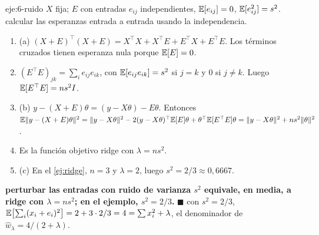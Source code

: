 \begin{solucion}{eje:6-ruido}
\datos $X$ fija; $E$ con entradas $e_{ij}$ independientes, $\mathbb{E}[e_{ij}]=0$, $\mathbb{E}[e_{ij}^{2}]=s^{2}$.
\planteamiento calcular las esperanzas entrada a entrada usando la independencia.
\pasos
\begin{enumerate}[label=\arabic*.]
  \item (a) $(X+E)^{\top}(X+E)=X^{\top}X+X^{\top}E+E^{\top}X+E^{\top}E$. Los términos cruzados tienen esperanza nula porque $\mathbb{E}[E]=0$.
  \item $(E^{\top}E)_{jk}=\sum_ie_{ij}e_{ik}$, con $\mathbb{E}[e_{ij}e_{ik}]=s^{2}$ si $j=k$ y $0$ si $j\ne k$. Luego $\mathbb{E}[E^{\top}E]=ns^{2}I$.
  \item (b) $y-(X+E)\theta=(y-X\theta)-E\theta$. Entonces $\mathbb{E}\lVert y-(X+E)\theta\rVert^{2}=\lVert y-X\theta\rVert^{2}-2(y-X\theta)^{\top}\mathbb{E}[E]\theta+\theta^{\top}\mathbb{E}[E^{\top}E]\theta=\lVert y-X\theta\rVert^{2}+ns^{2}\lVert\theta\rVert^{2}$.
  \item Es la función objetivo ridge con $\lambda=ns^{2}$.
  \item (c) En el \cref{ej:ridge}, $n=3$ y $\lambda=2$, luego $s^{2}=2/3\approx 0{,}6667$.
\end{enumerate}
\resultado \textbf{perturbar las entradas con ruido de varianza $s^{2}$ equivale, en media, a ridge con $\lambda=ns^{2}$; en el ejemplo, $s^{2}=2/3$.} $\blacksquare$
\comprobacion con $s^{2}=2/3$, $\mathbb{E}\bigl[\sum_i(x_i+e_i)^{2}\bigr]=2+3\cdot 2/3=4=\sum x_i^{2}+\lambda$, el denominador de $\hat w_\lambda=4/(2+\lambda)$.
\end{solucion}
